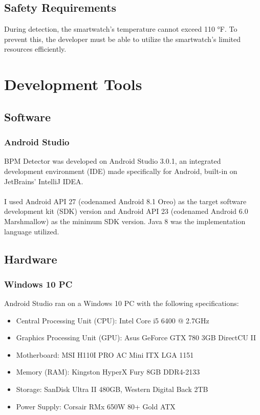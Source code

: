 \documentclass[12pt]{article}
\begin{document}
\subsection{Safety Requirements}
During detection, the smartwatch's temperature cannot exceed 110 °F. To prevent this, the developer must be able to utilize the smartwatch's limited resources efficiently.

\section{Development Tools}
\subsection{Software}
\subsubsection{Android Studio}
BPM Detector was developed on Android Studio 3.0.1, an integrated development environment (IDE) made specifically for Android, built-in on JetBrains' IntelliJ IDEA.
\\
\\
I used Android API 27 (codenamed Android 8.1 Oreo) as the target software development kit (SDK) version and Android API 23 (codenamed Android 6.0 Marshmallow) as the minimum SDK version. Java 8 was the implementation language utilized.

\subsection{Hardware}
\subsubsection{Windows 10 PC}
Android Studio ran on a Windows 10 PC with the following specifications:
\begin{itemize}
\item Central Processing Unit (CPU): Intel Core i5 6400 @ 2.7GHz
\item Graphics Processing Unit (GPU): Asus GeForce GTX 780 3GB DirectCU II
\item Motherboard: MSI H110I PRO AC Mini ITX LGA 1151
\item Memory (RAM): Kingston HyperX Fury 8GB DDR4-2133
\item Storage: SanDisk Ultra II 480GB, Western Digital Back 2TB
\item Power Supply: Corsair RMx 650W 80+ Gold ATX
\end{itemize}
\end{document}
